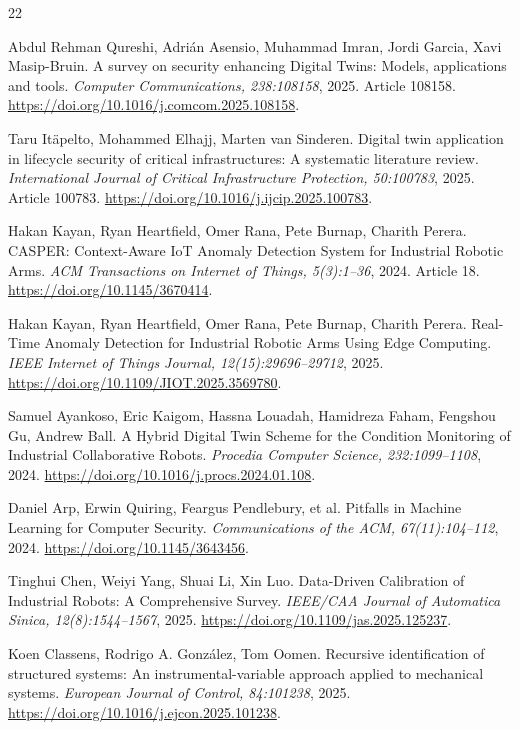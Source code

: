 \begin{thebibliography}{22}
\setlength{\itemsep}{1pt}\setlength{\parsep}{0pt}

 Abdul Rehman Qureshi, Adrián Asensio, Muhammad Imran, Jordi Garcia, Xavi Masip-Bruin. {A survey on security enhancing Digital Twins: Models, applications and tools}. \emph{Computer Communications, 238:108158}, 2025. Article 108158. \url{https://doi.org/10.1016/j.comcom.2025.108158}.

 Taru Itäpelto, Mohammed Elhajj, Marten van Sinderen. {Digital twin application in lifecycle security of critical infrastructures: A systematic literature review}. \emph{International Journal of Critical Infrastructure Protection, 50:100783}, 2025. Article 100783. \url{https://doi.org/10.1016/j.ijcip.2025.100783}.

 Hakan Kayan, Ryan Heartfield, Omer Rana, Pete Burnap, Charith Perera. {CASPER: Context-Aware IoT Anomaly Detection System for Industrial Robotic Arms}. \emph{ACM Transactions on Internet of Things, 5(3):1--36}, 2024. Article 18. \url{https://doi.org/10.1145/3670414}.

 Hakan Kayan, Ryan Heartfield, Omer Rana, Pete Burnap, Charith Perera. {Real-Time Anomaly Detection for Industrial Robotic Arms Using Edge Computing}. \emph{IEEE Internet of Things Journal, 12(15):29696--29712}, 2025. \url{https://doi.org/10.1109/JIOT.2025.3569780}.

 Samuel Ayankoso, Eric Kaigom, Hassna Louadah, Hamidreza Faham, Fengshou Gu, Andrew Ball. {A Hybrid Digital Twin Scheme for the Condition Monitoring of Industrial Collaborative Robots}. \emph{Procedia Computer Science, 232:1099--1108}, 2024. \url{https://doi.org/10.1016/j.procs.2024.01.108}.

 Daniel Arp, Erwin Quiring, Feargus Pendlebury, et al. {Pitfalls in Machine Learning for Computer Security}. \emph{Communications of the ACM, 67(11):104--112}, 2024. \url{https://doi.org/10.1145/3643456}.

 Tinghui Chen, Weiyi Yang, Shuai Li, Xin Luo. {Data-Driven Calibration of Industrial Robots: A Comprehensive Survey}. \emph{IEEE/CAA Journal of Automatica Sinica, 12(8):1544--1567}, 2025. \url{https://doi.org/10.1109/jas.2025.125237}.

 Koen Classens, Rodrigo A. Gonz{\'a}lez, Tom Oomen. {Recursive identification of structured systems: An instrumental-variable approach applied to mechanical systems}. \emph{European Journal of Control, 84:101238}, 2025. \url{https://doi.org/10.1016/j.ejcon.2025.101238}.


\end{thebibliography}
